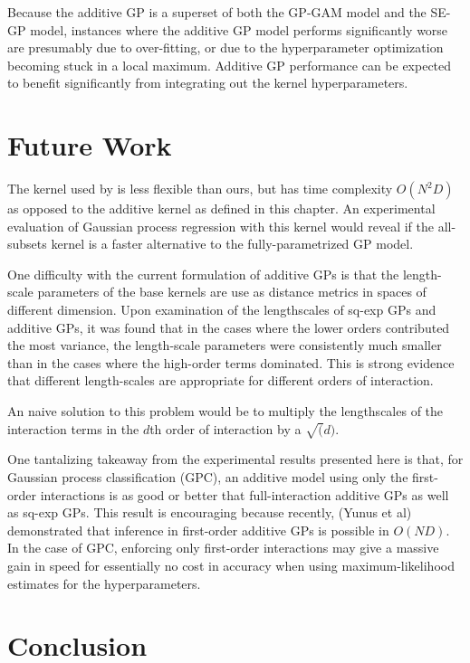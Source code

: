 Because the additive GP is a superset of both the GP-GAM model and the SE-GP model, instances where the additive GP model performs significantly worse are presumably due to over-fitting, or due to the hyperparameter optimization becoming stuck in a local maximum. %
Additive GP performance can be expected to benefit significantly from integrating out the kernel hyperparameters.

\section{Future Work}

The kernel used by \cite{DBLP:journals/corr/abs-0909-0844} is less flexible than ours, but has time complexity $O(N^2 D)$ as opposed to the additive kernel as defined in this chapter.  An experimental evaluation of Gaussian process regression with this kernel would reveal if the all-subsets kernel is a faster alternative to the fully-parametrized GP model.

One difficulty with the current formulation of additive GPs is that the length-scale parameters of the base kernels are use as distance metrics in spaces of different dimension.  Upon examination of the lengthscales of sq-exp GPs and additive GPs, it was found that in the cases where the lower orders contributed the most variance, the length-scale parameters were consistently much smaller than in the cases where the high-order terms dominated.  This is strong evidence that different length-scales are appropriate for different orders of interaction.

An naive solution to this problem would be to multiply the lengthscales of the interaction terms in the $d$th order of interaction by a $\sqrt(d)$.

One tantalizing takeaway from the experimental results presented here is that, for Gaussian process classification (GPC), an additive model using only the first-order interactions is as good or better that full-interaction additive GPs as well as sq-exp GPs.  This result is encouraging because recently, (Yunus et al) demonstrated that inference in first-order additive GPs is possible in $O(ND)$.  In the case of GPC, enforcing only first-order interactions may give a massive gain in speed for essentially no cost in accuracy when using maximum-likelihood estimates for the hyperparameters.

\section{Conclusion}

